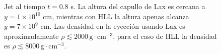 \documentclass[12pt,a4paper]{book}
\begin{document}
\begin{figure} 
\centering
{}
\caption{\label{fig:jet_ma_1000_analisis} Jet al tiempo $t = 0.8$ s. La altura del capullo de Lax es cercana a $y = 1 \times 10^{10}$ cm, mientras con HLL la altura apenas alcanza $y = 7 \times 10^{9}$ cm. Las densidad en la eyección usando Lax es aproximadamente $\rho   \lesssim 2000 \, \mathrm{g} \cdot \mathrm{cm}^{-3}$, para el caso de HLL la densidad es $\rho   \lesssim 8000 \, \mathrm{g} \cdot \mathrm{cm}^{-3}$. }
\end{figure}
\end{document}
